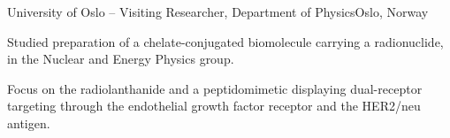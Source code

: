 % 
% 

\begin{rSubsection}{University of Oslo}{{} -- }{Visiting Researcher, Department of Physics}{Oslo, Norway}
\item    Studied preparation of a chelate-conjugated biomolecule carrying a radionuclide, in the Nuclear and Energy Physics group. 
\item    Focus on the radiolanthanide  and a peptidomimetic displaying dual-receptor targeting through the endothelial growth factor receptor and the HER2/neu antigen.
\end{rSubsection}
% 
% 




